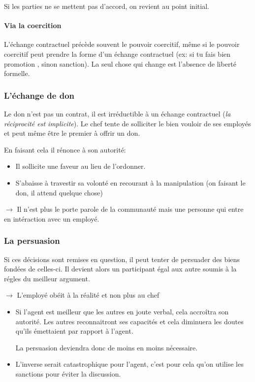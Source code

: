 \documentclass[11pt]{article} %
\begin{document}
Si les parties ne se mettent pas d'accord, on revient au point initial.

\paragraph{Via la coercition} L'échange contractuel précède souvent
le pouvoir coercitif, même si le pouvoir coercitif peut prendre la
forme d'un échange contractuel (ex: si tu fais bien promotion , sinon
sanction). La seul chose qui change est l'absence de liberté formelle.


\subsubsection{L'échange de don} 

Le don n'est pas un contrat, il est irréductible à un échange
contractuel (\textit{la réciprocité est implicite}). Le chef tente de
solliciter le bien vouloir de ses employés et peut même être le
premier à offrir un don. 

En faisant cela il rénonce à son autorité:

\begin{itemize}
 \item Il sollicite une faveur au lieu de l'ordonner.
 \item S'abaisse à travestir sa volonté en recourant à la
 manipulation (on faisant le don, il attend quelque chose)
\end{itemize}

$\to$ Il n'est plus le porte parole de la communauté mais une personne
qui entre en intéraction avec un employé.

\subsubsection{La persuasion} 

Si ces décisions sont remises en question, il peut tenter de persuader
des biens fondées de celles-ci. Il devient alors un participant égal
aux autre soumis à la régles du meilleur argument. 

$\to$ L'employé obéit à la réalité et non plus au chef

\begin{itemize}
    \item Si l'agent est meilleur que les autres en joute verbal, cela accroîtra
son autorité. Les autres reconnaitront ses capacités et cela diminuera
les doutes qu'ils émettaient par rapport à l'agent. 

La persuasion deviendra donc de moins en moins nécessaire.

\item L'inverse serait catastrophique pour l'agent, c'est pour cela qu'on
utilise les sanctions pour éviter la discussion.
\end{itemize}
\end{document}
